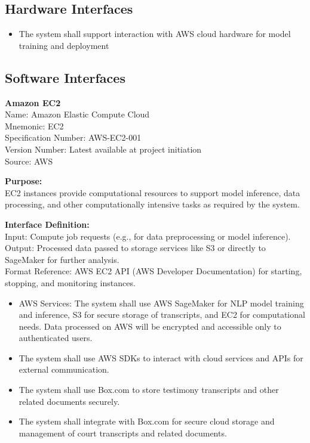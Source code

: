 \documentclass[12pt]{article}
\begin{document}
\subsection{Hardware Interfaces}
\begin{itemize}
  \item The system shall support interaction with AWS cloud hardware for model training and deployment
\end{itemize}

\subsection{ Software Interfaces}
 \textbf{  Amazon EC2}\\
 Name: Amazon Elastic Compute Cloud\\
 Mnemonic: EC2\\
 Specification Number: AWS-EC2-001\\
 Version Number: Latest available at project initiation\\
 Source: AWS

 \textbf{  Purpose:}\\
 EC2 instances provide computational resources to support model inference, data processing, and
 other computationally intensive tasks as required by the system.

 \textbf{  Interface Definition:}\\
 Input: Compute job requests (e.g., for data preprocessing or model inference).\\
 Output: Processed data passed to storage services like S3 or directly to SageMaker for further
 analysis.\\

 Format Reference: AWS EC2 API (AWS Developer Documentation) for starting, stopping, and
 monitoring instances.
\begin{itemize}
  \item AWS Services: The system shall use AWS SageMaker for NLP model training and
 inference, S3 for secure storage of transcripts, and EC2 for computational needs. Data
 processed on AWS will be encrypted and accessible only to authenticated users.
  \item The system shall use AWS SDKs to interact with cloud services and APIs for external
 communication.
\item The system shall use Box.com to store testimony transcripts and other related documents
 securely.
\item The system shall integrate with Box.com for secure cloud storage and management of court
 transcripts and related documents.
\end{itemize}
\end{document}
